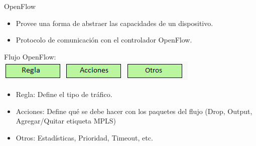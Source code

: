 \documentclass[xcolor=svgnames]{beamer}
\begin{document}
\begin{frame}{OpenFlow}
	\begin{itemize}
		\item Provee una forma de abstraer las capacidades de un dispositivo.
		\item Protocolo de comunicación con el controlador OpenFlow.
	\end{itemize}
	\pause
	\vspace{4mm}
	\begin{center}
		Flujo OpenFlow: \\
		\includegraphics[scale=0.7]{flujo_openflow}
	\end{center}
	\begin{itemize}
		\item Regla: Define el tipo de tráfico.
		\item Acciones: Define qué se debe hacer con los paquetes del flujo (Drop, Output, Agregar/Quitar etiqueta MPLS)
		\item Otros: Estadísticas, Prioridad, Timeout, etc.
	\end{itemize}
\end{frame}
\end{document}

